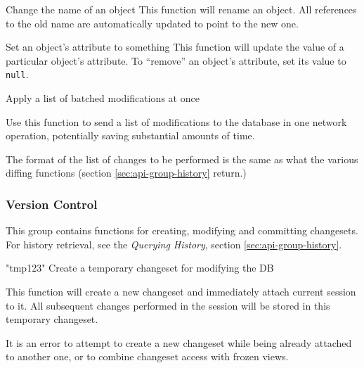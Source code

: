 \documentclass{article}
\begin{document}
    {}
    {Change the name of an object}
    {This function will rename an object.  All references to the old name are automatically updated to point to the new
    one.}

    {}
    {Set an object's attribute to something}
    {This function will update the value of a particular object's attribute.  To ``remove'' an object's attribute, set its
    value to {\tt null}.}

    {}
    {Apply a list of batched modifications at once}
    {Use this function to send a list of modifications to the database in one network operation, potentially saving
    substantial amounts of time.

    The format of the list of changes to be performed is the same as what the various diffing functions (section
    \ref{sec:api-group-history} return.)
    }

\subsubsection{Version Control}
\label{sec:api-group-vcs}

This group contains functions for creating, modifying and committing changesets.  For history retrieval, see the {\em
Querying History}, section \ref{sec:api-group-history}.

    {"tmp123"}
    {Create a temporary changeset for modifying the DB}
    {This function will create a new changeset and immediately attach current session to it.  All subsequent changes
    performed in the session will be stored in this temporary changeset.

    It is an error to attempt to create a new changeset while being already attached to another one, or to combine
    changeset access with frozen views.
    }
\end{document}
